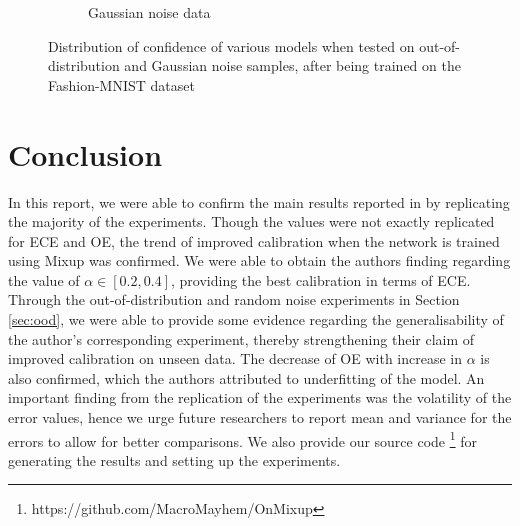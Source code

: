 \begin{figure}[h]
\begin{subfigure}[b]{0.45\textwidth}
         \caption{Gaussian noise data}
     \end{subfigure}
        \caption{Distribution of confidence of various models when tested on out-of-distribution and Gaussian noise samples, after being trained on the Fashion-MNIST dataset}
        \label{fig:out_dist}
\end{figure}


\section{Conclusion}
\label{sec:conclusion}
In this report, we were able to confirm the main
results reported in \cite{onmixup} by replicating the majority of the experiments. Though the values were not exactly replicated for ECE and OE, the trend of improved calibration when the network is trained using Mixup was confirmed. We were able to obtain the authors finding regarding the value of $\alpha \in [0.2, 0.4]$, providing the best calibration in terms of ECE. Through the out-of-distribution and random noise experiments in Section \ref{sec:ood}, we were able to provide some evidence regarding the generalisability of the author's corresponding experiment, thereby strengthening their claim of improved calibration on unseen data. The decrease of OE with increase in $\alpha$ is also confirmed, which the authors attributed to underfitting of the model. An important finding from the replication of the experiments was the volatility of the error values, hence we urge future researchers to report mean and variance for the errors to allow for better comparisons. We also provide our source code \footnote{https://github.com/MacroMayhem/OnMixup} for generating the results and setting up the experiments.
